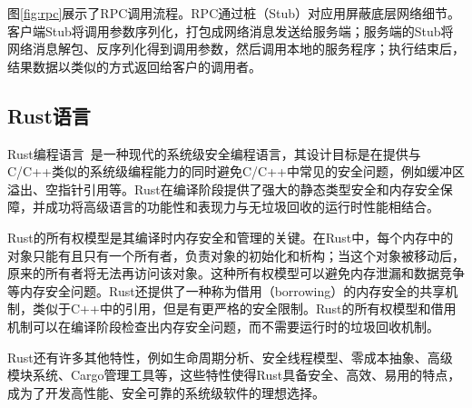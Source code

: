 图\ref{fig:rpc}展示了RPC调用流程。RPC通过桩（Stub）对应用屏蔽底层网络细节。客户端Stub将调用参数序列化，打包成网络消息发送给服务端；服务端的Stub将网络消息解包、反序列化得到调用参数，然后调用本地的服务程序；执行结束后，结果数据以类似的方式返回给客户的调用者。

\subsection{Rust语言}

Rust编程语言~\cite{rust-lang}是一种现代的系统级安全编程语言，其设计目标是在提供与C/C++类似的系统级编程能力的同时避免C/C++中常见的安全问题，例如缓冲区溢出、空指针引用等。Rust在编译阶段提供了强大的静态类型安全和内存安全保障，并成功将高级语言的功能性和表现力与无垃圾回收的运行时性能相结合。

Rust的所有权模型是其编译时内存安全和管理的关键。在Rust中，每个内存中的对象只能有且只有一个所有者，负责对象的初始化和析构；当这个对象被移动后，原来的所有者将无法再访问该对象。这种所有权模型可以避免内存泄漏和数据竞争等内存安全问题。Rust还提供了一种称为借用（borrowing）的内存安全的共享机制，类似于C++中的引用，但是有更严格的安全限制。Rust的所有权模型和借用机制可以在编译阶段检查出内存安全问题，而不需要运行时的垃圾回收机制。

Rust还有许多其他特性，例如生命周期分析、安全线程模型、零成本抽象、高级模块系统、Cargo管理工具等，这些特性使得Rust具备安全、高效、易用的特点，成为了开发高性能、安全可靠的系统级软件的理想选择。
